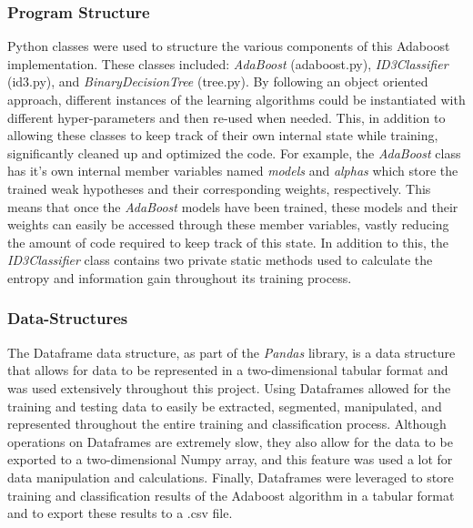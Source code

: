 \documentclass[a4paper]{article}
\begin{document}
\subsubsection{Program Structure}
Python classes were used to structure the various components of this Adaboost implementation. These classes included: \textit{AdaBoost} (adaboost.py), \textit{ID3Classifier} (id3.py), and \textit{BinaryDecisionTree} (tree.py). By following an object oriented approach, different instances of the learning algorithms could be instantiated with different hyper-parameters and then re-used when needed. This, in addition to allowing these classes to keep track of their own internal state while training, significantly cleaned up and optimized the code. For example, the \textit{AdaBoost} class has it's own internal member variables named \textit{models} and \textit{alphas} which store the trained weak hypotheses and their corresponding weights, respectively. This means that once the \textit{AdaBoost} models have been trained, these models and their weights can easily be accessed through these member variables, vastly reducing the amount of code required to keep track of this state. In addition to this, the \textit{ID3Classifier} class contains two private static methods used to calculate the entropy and information gain throughout its training process.

\subsubsection{Data-Structures}
The Dataframe data structure, as part of the \textit{Pandas} library, is a data structure that allows for data to be represented in a two-dimensional tabular format and was used extensively throughout this project. Using Dataframes allowed for the training and testing data to easily be extracted, segmented, manipulated, and represented throughout the entire training and classification process. Although operations on Dataframes are extremely slow, they also allow for the data to be exported to a two-dimensional Numpy array, and this feature was used a lot for data manipulation and calculations. Finally, Dataframes were leveraged to store training and classification results of the Adaboost algorithm in a tabular format and to export these results to a .csv file.
\end{document}

